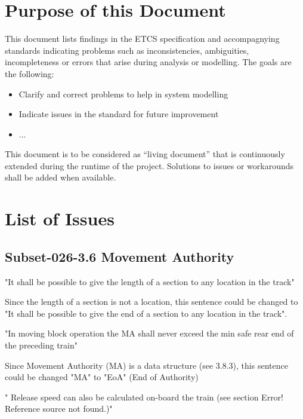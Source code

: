 \documentclass{template/openetcs_article}
\begin{document}
\tableofcontents
\newpage



\section{Purpose of this Document}

  This document lists findings in the ETCS specification and accompagnying standards indicating problems such as inconsistencies, ambiguities, incompleteness or errors that arise during analysis or modelling. The goals are the following:
  \begin{itemize}
    \item Clarify and correct problems to help in system modelling
    \item Indicate issues in the standard for future improvement
    \item ... 
  \end{itemize}

This document is to be considered as ``living document'' that is continuously extended during the runtime of the project. Solutions to issues or workarounds shall be added when available.



\section{List of Issues}

\subsection{Subset-026-3.6 Movement Authority}

 "It shall be possible to give the length of a section to any location in the track"

\resolution
Since the length of a section is not a location, this sentence could be changed to "It shall be possible to give the end of a section to any location in the track".

"In moving block operation the MA shall never exceed the min safe rear end of the preceding train"

\resolution
Since Movement Authority (MA) is a data structure (see 3.8.3), this sentence could be changed "MA" to "EoA" (End of Authority)


" Release speed can also be calculated on-board the train (see section Error! Reference source not found.)"
\end{document}
